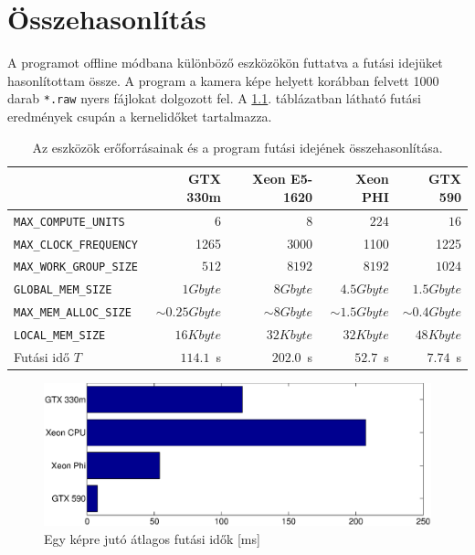 \chapter{Összehasonlítás}

	A programot offline módbana különböző eszközökön futtatva a futási idejüket hasonlítottam össze.
	A program a kamera képe helyett korábban felvett 1000 darab \texttt{*.raw} nyers fájlokat dolgozott fel.
	A \ref{table:results}. táblázatban látható futási eredmények csupán a kernelidőket tartalmazza.

	\begin{table}[H]
	\footnotesize
	\centering
	
	\begin{tabular}{ l | r | r | r | r}
		 & GTX 330m & Xeon E5-1620 & Xeon PHI & GTX 590\\ \hline
		\texttt{MAX\_COMPUTE\_UNITS} & $6$ & $8$ & $224$ & $16$\\
		\texttt{MAX\_CLOCK\_FREQUENCY} & 1265 & 3000 & 1100 & 1225\\
		\texttt{MAX\_WORK\_GROUP\_SIZE} & $512$ & $8192$ & $8192$ & $1024$\\ \hline\hline
		\texttt{GLOBAL\_MEM\_SIZE} & $1Gbyte$ & $8Gbyte$ & $4.5Gbyte$ & $1.5Gbyte$\\
		\texttt{MAX\_MEM\_ALLOC\_SIZE} & $\sim 0.25Gbyte$ & $\sim 8Gbyte$ & $\sim 1.5Gbyte$ & $\sim 0.4Gbyte$\\
		\texttt{LOCAL\_MEM\_SIZE} & $16 Kbyte$ & $32 Kbyte$ & $32 Kbyte$ & $48 Kbyte$\\
		Futási idő $T$ & $114.1$~s & $202.0$~s & $52.7$~s & $7.74$~s
	\end{tabular}
	
	\caption[Különböző eszközök futási idejének összehasonlítása]{Az eszközök erőforrásainak és a program futási idejének összehasonlítása.}
	\label{table:results}
	\end{table}
	
	\begin{figure}[!h]
	\begin{center}
	  \includegraphics[width=0.9\columnwidth]{figures/eps/runtime.eps}
	  \caption{Egy képre jutó átlagos futási idők [ms]}
	  \label{fig:runtime}
	\end{center}
	\end{figure}
	
